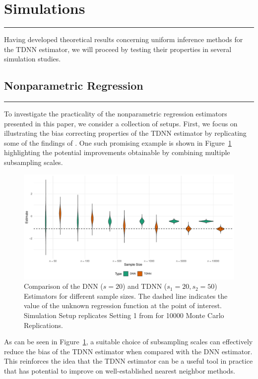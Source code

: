 \section{Simulations}\label{sec:simulations}
\hrule

Having developed theoretical results concerning uniform inference methods for the TDNN estimator, we will proceed by testing their properties in several simulation studies.

\subsection{Nonparametric Regression}
\hrule
To investigate the practicality of the nonparametric regression estimators presented in this paper, we consider a collection of setups.
First, we focus on illustrating the bias correcting properties of the TDNN estimator by replicating some of the findings of \citet{demirkaya_optimal_2024}.
One such promising example is shown in Figure~\ref{fig:TDNN_bias_cor} highlighting the potential improvements obtainable by combining multiple subsampling scales.
\begin{figure}[H]
	\centering
	\includegraphics[width = \textwidth]{../Code/Simulations/Graphics/TDNN_DNN.pdf}
	\caption{Comparison of the DNN ($s = 20$) and TDNN ($s_1 = 20, s_2 = 50$) Estimators for different sample sizes.
		The dashed line indicates the value of the unknown regression function at the point of interest.
		Simulation Setup replicates Setting 1 from \citet{demirkaya_optimal_2024} for 10000 Monte Carlo Replications.}
	\label{fig:TDNN_bias_cor}
\end{figure}
As can be seen in Figure~\ref{fig:TDNN_bias_cor}, a suitable choice of subsampling scales can effectively reduce the bias of the TDNN estimator when compared with the DNN estimator.
This reinforces the idea that the TDNN estimator can be a useful tool in practice that has potential to improve on well-established nearest neighbor methods.

